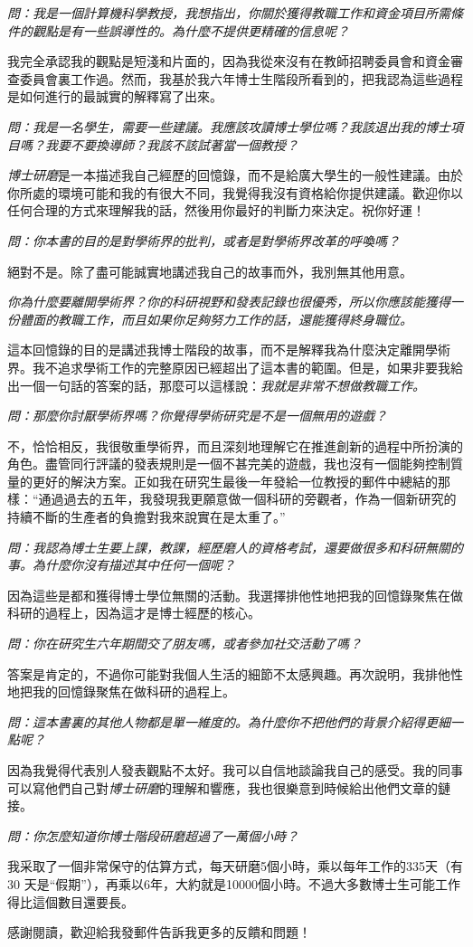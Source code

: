 \documentclass[12pt,UTF8,nofonts]{book}
\newcommand{\bookname}{博士研磨}
\begin{document}
\emph{問：我是一個計算機科學教授，我想指出，你關於獲得教職工作和資金項目所需條件的觀點是有一些誤導性的。為什麼不提供更精確的信息呢？}

我完全承認我的觀點是短淺和片面的，因為我從來沒有在教師招聘委員會和資金審查委員會裏工作過。然而，我基於我六年博士生階段所看到的，把我認為這些過程是如何進行的最誠實的解釋寫了出來。

\emph{問：我是一名學生，需要一些建議。我應該攻讀博士學位嗎？我該退出我的博士項目嗎？我要不要換導師？我該不該試著當一個教授？}

\emph{\bookname}是一本描述我自己經歷的回憶錄，而不是給廣大學生的一般性建議。由於你所處的環境可能和我的有很大不同，我覺得我沒有資格給你提供建議。歡迎你以任何合理的方式來理解我的話，然後用你最好的判斷力來決定。祝你好運！

\emph{問：你本書的目的是對學術界的批判，或者是對學術界改革的呼喚嗎？}

絕對不是。除了盡可能誠實地講述我自己的故事而外，我別無其他用意。

\emph{你為什麼要離開學術界？你的科研視野和發表記錄也很優秀，所以你應該能獲得一份體面的教職工作，而且如果你足夠努力工作的話，還能獲得終身職位。}

這本回憶錄的目的是講述我博士階段的故事，而不是解釋我為什麼決定離開學術界。我不追求學術工作的完整原因已經超出了這本書的範圍。但是，如果非要我給出一個一句話的答案的話，那麼可以這樣說：\emph{我就是非常不想做教職工作。}

\emph{問：那麼你討厭學術界嗎？你覺得學術研究是不是一個無用的遊戲？}

不，恰恰相反，我很敬重學術界，而且深刻地理解它在推進創新的過程中所扮演的角色。盡管同行評議的發表規則是一個不甚完美的遊戲，我也沒有一個能夠控制質量的更好的解決方案。正如我在研究生最後一年發給一位教授的郵件中總結的那樣：“通過過去的五年，我發現我更願意做一個科研的旁觀者，作為一個新研究的持續不斷的生產者的負擔對我來說實在是太重了。”

\emph{問：我認為博士生要上課，教課，經歷磨人的資格考試，還要做很多和科研無關的事。為什麼你沒有描述其中任何一個呢？}

因為這些是都和獲得博士學位無關的活動。我選擇排他性地把我的回憶錄聚焦在做科研的過程上，因為這才是博士經歷的核心。

\emph{問：你在研究生六年期間交了朋友嗎，或者參加社交活動了嗎？}

答案是肯定的，不過你可能對我個人生活的細節不太感興趣。再次說明，我排他性地把我的回憶錄聚焦在做科研的過程上。

\emph{問：這本書裏的其他人物都是單一維度的。為什麼你不把他們的背景介紹得更細一點呢？}

因為我覺得代表別人發表觀點不太好。我可以自信地談論我自己的感受。我的同事可以寫他們自己對\emph{\bookname}的理解和響應，我也很樂意到時候給出他們文章的鏈接。

\emph{問：你怎麼知道你博士階段研磨超過了一萬個小時？}

我采取了一個非常保守的估算方式，每天研磨5個小時，乘以每年工作的335天（有30 天是“假期”），再乘以6年，大約就是10000個小時。不過大多數博士生可能工作得比這個數目還要長。

感謝閱讀，歡迎給我發郵件告訴我更多的反饋和問題！

\clearpage
\clearpage
\end{document}
